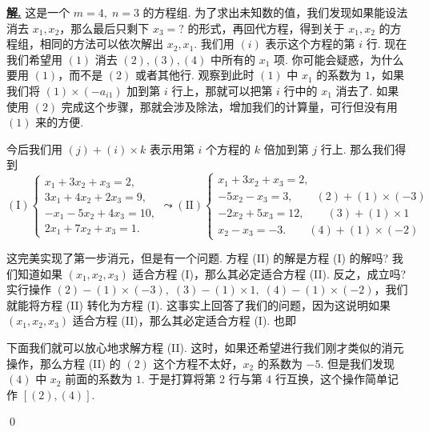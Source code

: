 \documentclass[10pt,openany]{article}
\theoremstyle{thmstyle} %
\theoremstyle{defstyle} %
\theoremstyle{prostyle} %
\theoremstyle{exastyle}
\theoremstyle{remstyle}
\newenvironment{solution}{\par\underline{\textbf{解.}} \;\fangsong}{\qed\par}
\begin{document}
\begin{solution}
	这是一个 \( m=4, \; n=3 \) 的方程组. 为了求出未知数的值，我们发现如果能设法消去 \( x_1,x_2 \)，那么最后只剩下 \( x_3=? \) 的形式，再回代方程，得到关于 \( x_1,x_2 \) 的方程组，相同的方法可以依次解出 \( x_2,x_1 \). 我们用 \( (i) \) 表示这个方程的第 \( i \) 行. 现在我们希望用 \( (1) \) 消去 \( (2),(3),(4) \) 中所有的 \( x_1 \) 项. 你可能会疑惑，为什么要用 \( (1) \)，而不是 \( (2) \) 或者其他行. 观察到此时 \( (1) \) 中 \( x_1 \) 的系数为 \( 1 \)，如果我们将 \( (1) \times (-a_{i1}) \) 加到第 \( i \) 行上，那就可以把第 \( i \) 行中的 \( x_1 \) 消去了. 如果使用 \( (2) \) 完成这个步骤，那就会涉及除法，增加我们的计算量，可行但没有用 \( (1) \) 来的方便. 
	
	今后我们用 \( (j)+(i) \times k \) 表示用第 \( i \) 个方程的 \( k \) 倍加到第 \( j \) 行上. 那么我们得到
	\[ (\text{I}) \left\{
	\begin{array}{l}
		x_1 + 3x_2 + x_3 = 2, \\
		3x_1 + 4x_2 + 2x_3 = 9, \\
		-x_1 - 5x_2 + 4x_3 = 10, \\
		2x_1 + 7x_2 + x_3 = 1.
	\end{array}
	\right. \leadsto (\text{II}) \left\{
	\begin{array}{l}
		x_1 + 3x_2 + x_3 = 2, \\
		-5x_2 - x_3 = 3, \qquad (2)+(1) \times (-3) \\
		-2x_2 + 5x_3 = 12, \qquad (3)+(1) \times 1 \\
		x_2 - x_3 = -3.\qquad (4)+(1) \times (-2)
	\end{array}
	\right.\]
	
	这完美实现了第一步消元，但是有一个问题. 方程 (II) 的解是方程 (I) 的解吗? 我们知道如果 \( (x_1,x_2,x_3) \) 适合方程 (I)，那么其必定适合方程 (II). 反之，成立吗? 实行操作 \( (2)-(1) \times (-3), \; (3)-(1) \times 1, \; (4)-(1) \times (-2) \)，我们就能将方程 (II) 转化为方程 (I). 这事实上回答了我们的问题，因为这说明如果 \( (x_1,x_2,x_3) \) 适合方程 (II)，那么其必定适合方程 (I). 也即
	
	\begin{center}
	\end{center}
	
	下面我们就可以放心地求解方程 (II). 这时，如果还希望进行我们刚才类似的消元操作，那么方程 (II) 的 \( (2) \) 这个方程不太好，\( x_2 \) 的系数为 \( -5 \). 但是我们发现 \( (4) \) 中  \( x_2 \) 前面的系数为 \( 1 \). 于是打算将第 2 行与第 4 行互换，这个操作简单记作 \( [(2),(4)] \).
	

\end{solution}
\end{document}

